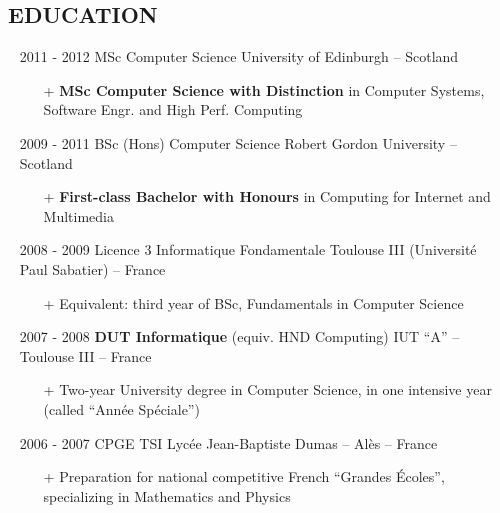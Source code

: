 \documentclass{res}
\begin{document}
\begin{resume}
\section{\faGraduationCap~EDUCATION}
    \begin{itemize}
        \item[] 2011 - 2012 \tabto{2cm} MSc Computer Science \hfill University of Edinburgh -- Scotland
        \begin{itemize}
            \item[+] \textbf{MSc Computer Science with Distinction} in Computer Systems, Software Engr. and High Perf. Computing
        \end{itemize}

        \item[] 2009 - 2011 \tabto{2cm} BSc (Hons) Computer Science \hfill Robert Gordon University -- Scotland
        \begin{itemize}
            \item[+] \textbf{First-class Bachelor with Honours} in Computing for Internet and Multimedia
        \end{itemize}

        \item[] 2008 - 2009 \tabto{2cm} Licence 3 Informatique Fondamentale \hfill Toulouse III (Universit\'e Paul Sabatier) -- France
        \begin{itemize}
            \item[+] Equivalent: third year of BSc, Fundamentals in Computer Science
        \end{itemize}

        \item[] 2007 - 2008 \tabto{2cm} \textbf{DUT Informatique} (equiv. HND Computing) \hfill IUT ``A'' -- Toulouse III -- France
        \begin{itemize}
            \item[+] Two-year University degree in Computer Science, in one intensive year (called ``Ann\'ee Sp\'eciale'')
        \end{itemize}

        \item[] 2006 - 2007 \tabto{2cm} CPGE TSI \hfill Lyc\'ee Jean-Baptiste Dumas -- Al\`es -- France
        \begin{itemize}
            \item[+] Preparation for national competitive French ``Grandes \'Ecoles'', specializing in Mathematics and Physics
        \end{itemize}


\end{itemize}
\end{resume}
\end{document}
